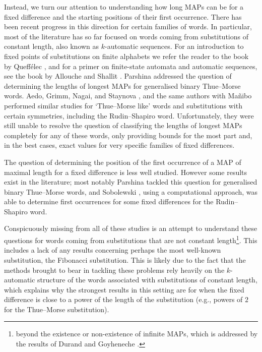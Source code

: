 \documentclass[10pt,a4paper,reqno]{amsart}
\newcommand{\seqnum}[1]{\href{https://oeis.org/#1}{\rm \underline{#1}}}
\begin{document}
Instead, we turn our attention to understanding how long MAPs can be for a fixed difference and the starting positions of their first occurrence. There has been recent progress in this direction for certain families of words. In particular, most of the literature has so far focused on words coming from substitutions of constant length, also known as $k$-automatic sequences. For an introduction to fixed points of substitutions on finite alphabets we refer the reader to the book by Queff\'{e}lec \cite{queffelec2010}, and for a primer on finite-state automata and automatic sequences, see the book by Allouche and Shallit \cite{AS2003}. Parshina \cite{parshina15} addressed the question of determining the lengths of longest MAPs for generalised binary Thue--Morse words. Aedo, Grimm, Nagai, and Staynova \cite{aedo2022}, and the same authors with Ma\~nibo \cite{aedo2023} performed similar studies for `Thue--Morse like' words and substitutions with certain symmetries, including the Rudin--Shapiro word. Unfortunately, they were still unable to resolve the question of classifying the lengths of longest MAPs completely for any of these words, only providing bounds for the most part and, in the best cases, exact values for very specific families of fixed differences.

The question of determining the position of the first occurrence of a MAP of maximal length for a fixed difference is less well studied. However some results exist in the literature; most notably Parshina \cite{parshina17} tackled this question for generalised binary Thue--Morse words,
and Sobolewski \cite{sobo23}, using a computational approach, was able to determine first occurrences for some fixed differences for the Rudin--Shapiro word.

Conspicuously missing from all of these studies is an attempt to understand these questions for words coming from substitutions that are not constant length\footnote{beyond the existence or non-existence of infinite MAPs, which is addressed by the results of Durand and Goyheneche \cite{dg2019}.}. This includes a lack of any results concerning perhaps the most well-known substitution, the Fibonacci substitution.
This is likely due to the fact that the methods brought to bear in tackling these problems rely heavily on the $k$-automatic structure of the words associated with substitutions of constant length, which explains why the strongest results in this setting are for when the fixed difference is close to a power of the length of the substitution (e.g., powers of $2$ for the Thue--Morse substitution).
\end{document}
